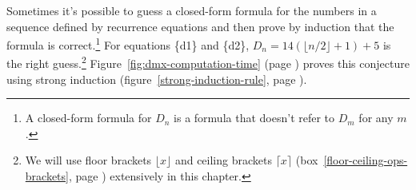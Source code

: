 Sometimes it's possible to guess a closed-form formula
for the numbers in a sequence defined by recurrence equations
and then prove by induction that the formula is
correct.\footnote{A
\label{footnote:closed-form}closed-form formula
for $D_n$ is a formula
that doesn't refer to $D_m$ for any $m$.}
For equations \{d1\} and \{d2\},
$D_{n} = 14(\lfloor n/2\rfloor + 1) + 5$ is the right guess.\footnote{We
will use floor brackets $\lfloor x\rfloor$ and ceiling brackets $\lceil x\rceil$
(box~\ref{floor-ceiling-ops-brackets}, page \pageref{floor-ceiling-ops-brackets})
extensively in this chapter.}
Figure~\ref{fig:dmx-computation-time}
(page \pageref{fig:dmx-computation-time}) proves
this conjecture using strong induction
(figure~\ref{strong-induction-rule}, page \pageref{strong-induction-rule}).

